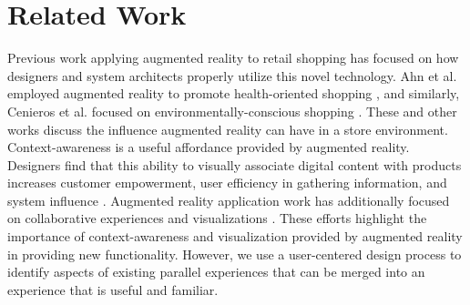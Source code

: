 \section{Related Work}

Previous work applying augmented reality to retail shopping has focused on how designers and system architects properly utilize this novel technology. Ahn et al. employed augmented reality to promote health-oriented shopping \cite{ahn2015supporting}, and similarly, Cenieros et al. focused on environmentally-conscious shopping \cite{ceniceros2014augmented}. These and other works \cite{esser2016head,stoyanova2015comparison} discuss the influence augmented reality can have in a store environment. Context-awareness is a useful affordance provided by augmented reality.  Designers find that this ability to visually associate digital content with products increases customer empowerment, user efficiency in gathering information, and system influence \cite{kourouthanassis2007enhancing,olsson2013expected,zhu2004personalized}. Augmented reality application work has additionally focused on collaborative experiences and visualizations \cite{esser2016head,santos2016augmented,stoyanova2015comparison,truong2013today}. These efforts highlight the importance of context-awareness and visualization provided by augmented reality in providing new functionality. However, we use a user-centered design process to identify aspects of existing parallel experiences that can be merged into an experience that is useful and familiar.

